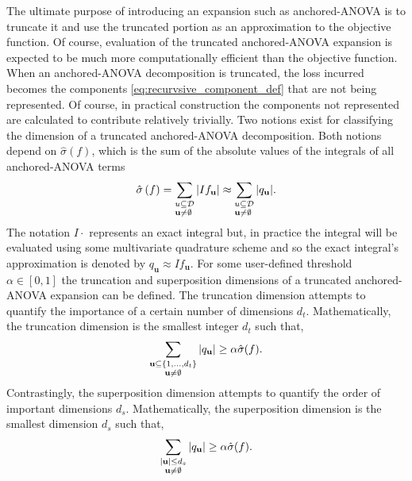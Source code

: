 The ultimate purpose of introducing an expansion such as anchored-\ac{ANOVA} is to truncate it and use the truncated portion as an approximation to the objective function. Of course, evaluation of the truncated anchored-\ac{ANOVA} expansion is expected to be much more computationally efficient than the objective function. When an anchored-\ac{ANOVA} decomposition is truncated, the loss incurred becomes the components \ref{eq:recurvsive_component_def} that are not being represented. Of course, in practical construction the components not represented are calculated to contribute relatively trivially. Two notions exist for classifying the dimension of a truncated anchored-\ac{ANOVA} decomposition. Both notions depend on $\hat{\sigma}(f)$, which is the sum of the absolute values of the integrals of all anchored-\ac{ANOVA} terms \cite{Holtz}
\begin{equation} \label{eq:sum_all_integrated_components}
    \hat{\sigma}\left(f\right) = 
     \sum_{\begin{subarray}
     \textbf{u} \subseteq \mathcal{D} \\
     \textbf{u} \neq \emptyset
     \end{subarray}}
      \vert If_\textbf{u} \vert \approx
       \sum_{\begin{subarray}
       \textbf{u} \subseteq \mathcal{D} \\
       \textbf{u} \neq \emptyset
       \end{subarray}}
        \vert q_\textbf{u} \vert .
\end{equation}
The notation $I\cdot$ represents an exact integral but, in practice the integral will be evaluated using some multivariate quadrature scheme and so the exact integral's approximation is denoted by $q_\textbf{u} \approx If_\textbf{u}$. For some user-defined threshold $\alpha \in \left[0,1\right]$ the truncation and superposition dimensions of a truncated anchored-\ac{ANOVA} expansion can be defined. The truncation dimension attempts to quantify the importance of a certain number of dimensions $d_t$. Mathematically, the truncation dimension is the smallest integer $d_t$ such that,
\begin{equation} \label{eq:trunc_dimension}
    \sum_{
     \begin{subarray}{c}
     \textbf{u} \subseteq \lbrace1,...,d_t\rbrace \\
     \textbf{u} \neq \emptyset
     \end{subarray}
    } 
     \vert q_\textbf{u} \vert \geq \alpha \hat{\sigma}(f). \nonumber
\end{equation}
Contrastingly, the superposition dimension attempts to quantify the order of important dimensions $d_s$. Mathematically, the superposition dimension is the smallest dimension $d_s$ such that,
\begin{equation} \label{eq:sup_dimension}
    \sum_{
     \begin{subarray}{c}
     \vert\textbf{u}\vert \leq d_s \\
     \textbf{u} \neq \emptyset
     \end{subarray}
    } 
     \vert q_\textbf{u} \vert \geq \alpha \hat{\sigma}(f). \nonumber
\end{equation}
       
